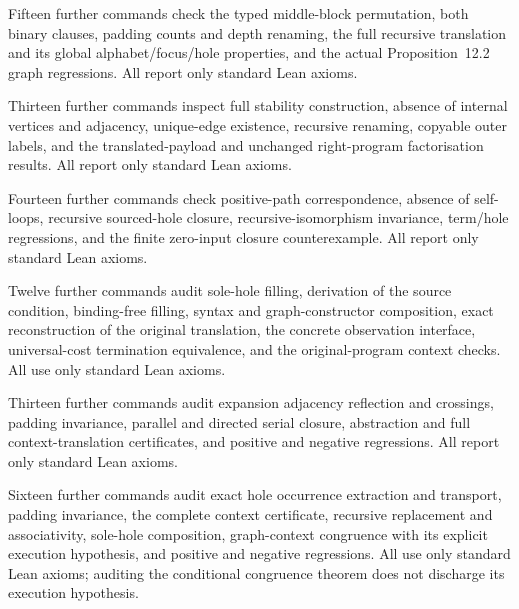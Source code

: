 Fifteen further commands check the typed middle-block permutation, both
binary clauses, padding counts and depth renaming, the full recursive
translation and its global alphabet/focus/hole properties, and the actual
Proposition~12.2 graph regressions. All report only standard Lean axioms.


Thirteen further commands inspect full stability construction, absence of
internal vertices and adjacency, unique-edge existence, recursive renaming,
copyable outer labels, and the translated-payload and unchanged right-program
factorisation results. All report only standard Lean axioms.


Fourteen further commands check positive-path correspondence, absence of
self-loops, recursive sourced-hole closure, recursive-isomorphism invariance,
term/hole regressions, and the finite zero-input closure counterexample.
All report only standard Lean axioms.


Twelve further commands audit sole-hole filling, derivation of the source
condition, binding-free filling, syntax and graph-constructor composition,
exact reconstruction of the original translation, the concrete observation
interface, universal-cost termination equivalence, and the original-program
context checks. All use only standard Lean axioms.


Thirteen further commands audit expansion adjacency reflection and crossings,
padding invariance, parallel and directed serial closure, abstraction and
full context-translation certificates, and positive and negative regressions.
All report only standard Lean axioms.


Sixteen further commands audit exact hole occurrence extraction and transport,
padding invariance, the complete context certificate, recursive replacement
and associativity, sole-hole composition, graph-context congruence with its
explicit execution hypothesis, and positive and negative regressions.
All use only standard Lean axioms; auditing the conditional congruence theorem
does not discharge its execution hypothesis.


